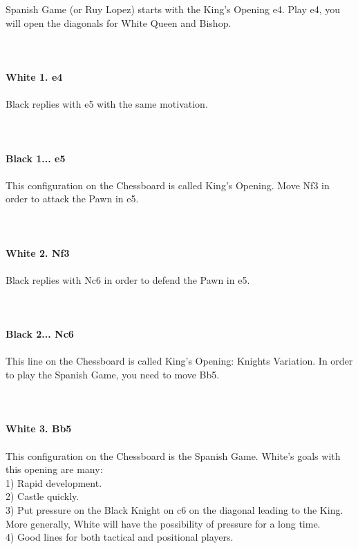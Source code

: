 \documentclass{article}
\begin{document}
Spanish Game (or Ruy Lopez) starts with the King’s Opening e4. Play e4, you will open the diagonals for White Queen and Bishop.\\
\\

\\
\\
\textbf{White 1. e4}\\
\\
Black replies with e5 with the same motivation.\\
\\

\\
\\
\textbf{Black 1... e5}\\
\\
This configuration on the Chessboard is called King's Opening. Move Nf3 in order to attack the Pawn in e5.\\
\\

\\
\\
\textbf{White 2. Nf3}\\
\\
Black replies with Nc6 in order to defend the Pawn in e5.\\
\\

\\
\\
\textbf{Black 2... Nc6}\\
\\
This line on the Chessboard is called King's Opening: Knights Variation. In order to play the Spanish Game, you need to move Bb5.\\
\\

\\
\\
\textbf{White 3. Bb5}\\
\\
This configuration on the Chessboard is the Spanish Game. White's goals with this opening are many:\\1) Rapid development.\\2) Castle quickly.\\3) Put pressure on the Black Knight on c6 on the diagonal leading to the King. More generally, White will have the possibility of pressure for a long time.\\4) Good lines for both tactical and positional players.\\
\\
\end{document}

